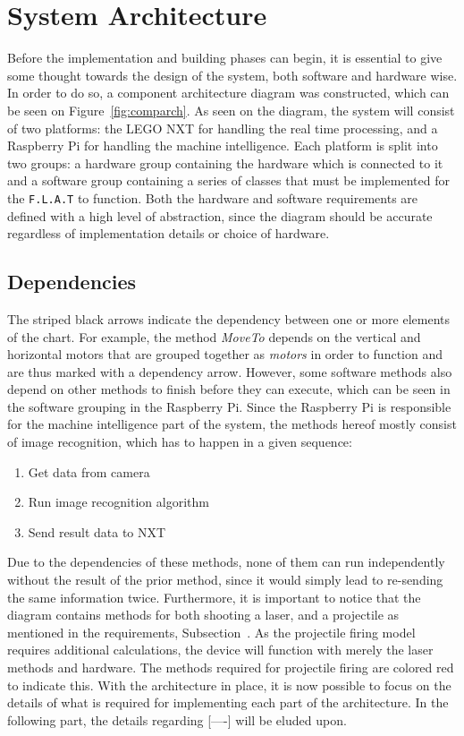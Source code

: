\section{System Architecture}
Before the implementation and building phases can begin, it is essential to give some thought towards the design of the system, both software and hardware wise.
In order to do so, a component architecture diagram was constructed, which can be seen on Figure~\ref{fig:comparch}.
As seen on the diagram, the system will consist of two platforms: the LEGO NXT for handling the real time processing, and a Raspberry Pi for handling the machine intelligence.
Each platform is split into two groups: a hardware group containing the hardware which is connected to it and a software group containing a series of classes that must be implemented for the \texttt{F.L.A.T} to function.
Both the hardware and software requirements are defined with a high level of abstraction, since the diagram should be accurate regardless of implementation details or choice of hardware.
 
\subsection*{Dependencies}
The striped black arrows indicate the dependency between one or more elements of the chart. 
For example, the method \textit{MoveTo} depends on the vertical and horizontal motors that are grouped together as \textit{motors} in order to function and are thus marked with a dependency arrow.
However, some software methods also depend on other methods to finish before they can execute, which can be seen in the software grouping in the Raspberry Pi.
Since the Raspberry Pi is responsible for the machine intelligence part of the system, the methods hereof mostly consist of image recognition, which has to happen in a given sequence:
\begin{enumerate}
\item Get data from camera
\item Run image recognition algorithm
\item Send result data to NXT
\end{enumerate}

Due to the dependencies of these methods, none of them can run independently without the result of the prior method, since it would simply lead to re-sending the same information twice.
Furthermore, it is important to notice that the diagram contains methods for both shooting a laser, and a projectile as mentioned in the requirements, Subsection~\label{subsec:requirements}.
As the projectile firing model requires additional calculations, the device will function with merely the laser methods and hardware. 
The methods required for projectile firing are colored red to indicate this.
With the architecture in place, it is now possible to focus on the details of what is required for implementing each part of the architecture.
In the following part, the details regarding [----] will be eluded upon.


